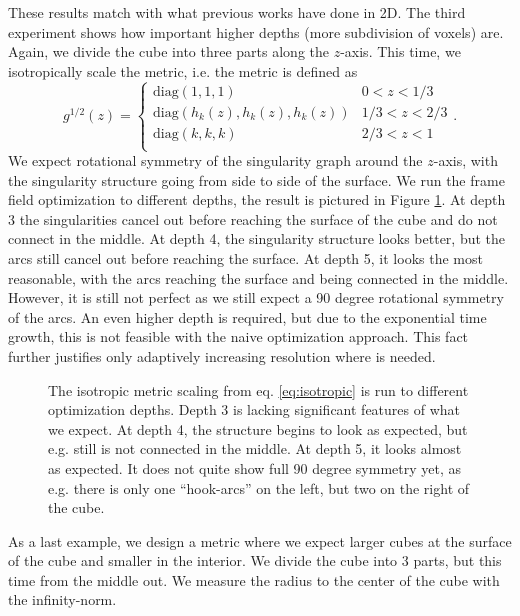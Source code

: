 \documentclass[../thesis.tex]{subfiles}
\begin{document}
These results match with what previous works have done in 2D.
The third experiment shows how important higher depths (more subdivision of voxels) are.
Again, we divide the cube into three parts along the $z$-axis.
This time, we isotropically scale the metric, i.e. the metric is defined as
\begin{equation}
g^{1/2}(z) = \begin{cases}
    \mathrm{diag}(1,1,1) &0 < z < 1/3 \\
    \mathrm{diag}(h_k(z), h_k(z), h_k(z)) &1/3 < z < 2/3 \\
    \mathrm{diag}(k,k,k) &2/3 < z < 1 \\
\end{cases}.\end{equation}\label{eq:isotropic} 
We expect rotational symmetry of the singularity graph around the $z$-axis,
with the singularity structure going from side to side of the surface. We run the frame field optimization to different
depths, the result is pictured in Figure \ref{fig:isotropic}. At depth 3 the singularities
cancel out before reaching the surface of the cube and do not connect in the middle. At depth 4, the singularity structure
looks better, but the arcs still cancel out before reaching the surface. At depth 5, it looks
the most reasonable, with the arcs reaching the surface and being connected in the middle.
However, it is still not perfect as we still expect a 90 degree rotational symmetry of the arcs.
An even higher depth is required, but due to the exponential time growth, this is not feasible
with the naive optimization approach. This fact further justifies only adaptively increasing resolution where is needed.
\begin{figure}[htb]
    \centering
    \def\svgwidth{\textwidth}
    
    \caption{The isotropic metric scaling from eq. \ref{eq:isotropic} is run to different optimization depths.
    Depth 3 is lacking significant features of what we expect. At depth 4, the structure begins to look as expected, but e.g. still is not connected in the middle.
    At depth 5, it looks almost as expected. It does not quite show full 90 degree symmetry yet, as e.g. there is only one ``hook-arcs'' on the left, but two on the right of the cube.}
    \label{fig:isotropic}
\end{figure}
As a last example, we design a metric where we expect larger cubes at the surface of the cube and smaller in the interior.
We divide the cube into 3 parts, but this time from the middle out.
We measure the radius to the center of the cube with the infinity-norm.
\end{document}
